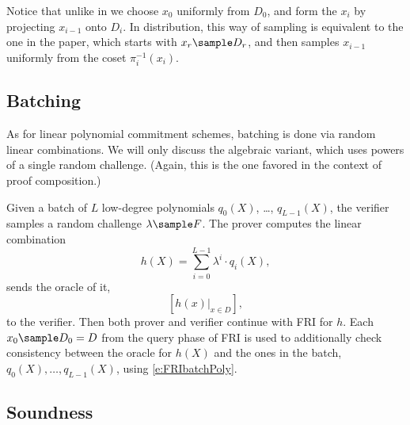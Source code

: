 \documentclass[11pt]{article}
\theoremstyle{definition}
\theoremstyle{remark}
\begin{document}
Notice that unlike in \cite{ProximityGaps} we choose $x_0$ uniformly from $D_0$, and form the $x_i$ by projecting $x_{i-1}$ onto $D_i$. 
In distribution, this way of sampling is equivalent to the one in the paper, which starts with $x_r\sample D_r$,  and then samples $x_{i-1}$ uniformly from the coset  $\pi_i^{-1}(x_i)$.

\subsection{Batching}
As for linear polynomial commitment schemes, batching is done via random linear combinations. 
We will only discuss the algebraic variant, which uses powers of a single random challenge. 
(Again, this is the one favored in the context of proof composition.)

Given a batch of $L$ low-degree polynomials $q_0(X)$, \ldots, $q_{L-1}(X)$, the verifier samples a random challenge $\lambda\sample F$. 
The prover computes the linear combination
\begin{equation}
\label{e:FRIbatchPoly}
h(X) = \sum_{i=0}^{L-1} \lambda^i\cdot q_i(X),
\end{equation}
sends the oracle of it,
\[
[h(x)|_{x\in D}],
\]
to the verifier.
Then both prover and verifier continue with FRI for $h$. 
Each $x_0\sample D_0=D$ from the query phase of FRI is used to additionally check consistency between the oracle for $h(X)$ and the ones in the batch, $q_0(X),\ldots, q_{L-1}(X)$, using \eqref{e:FRIbatchPoly}. 


\subsection{Soundness}





\end{document}
